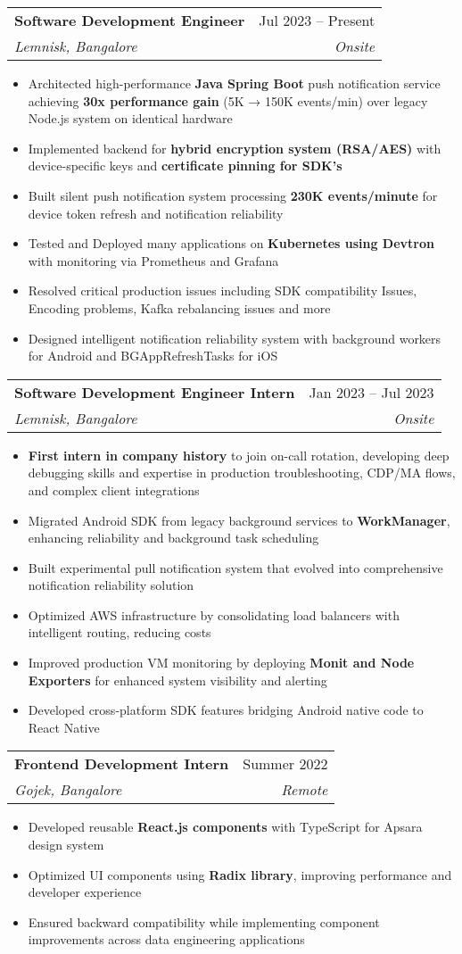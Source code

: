 \documentclass[letterpaper,10pt]{article}
\makeatletter
\newcommand{\resumeItem}[1]{
  \item\small{
    {#1 \vspace{-2pt}}
  }
}
\newcommand{\resumeSubheading}[4]{
  \vspace{-1pt}\item
    \begin{tabular*}{0.97\textwidth}[t]{l@{\extracolsep{\fill}}r}
      \textbf{#1} & #2 \\
      \textit{\small#3} & \textit{\small #4} \\
    \end{tabular*}\vspace{-5pt}
}
\newcommand{\resumeItemListStart}{\begin{itemize}[leftmargin=0.1in]}
\newcommand{\resumeItemListEnd}{\end{itemize}\vspace{-5pt}}
\makeatother
\begin{document}
    \resumeSubheading
      {Software Development Engineer}{Jul 2023 -- Present}
      {Lemnisk, Bangalore}{Onsite}
      \resumeItemListStart
        \resumeItem{Architected high-performance \textbf{Java Spring Boot} push notification service achieving \textbf{30x performance gain} (5K → 150K events/min) over legacy Node.js system on identical hardware}
        \resumeItem{Implemented backend for \textbf{hybrid encryption system (RSA/AES)} with device-specific keys and \textbf{certificate pinning for SDK's}}
        \resumeItem{Built silent push notification system processing \textbf{230K events/minute} for device token refresh and notification reliability}
        \resumeItem{Tested and Deployed many applications on \textbf{Kubernetes using Devtron} with monitoring via Prometheus and Grafana}
        \resumeItem{Resolved critical production issues including SDK compatibility Issues, Encoding problems, Kafka rebalancing issues and more}
        \resumeItem{Designed intelligent notification reliability system with background workers for Android and BGAppRefreshTasks for iOS}
      \resumeItemListEnd

    \vspace{5pt} %
    
    \resumeSubheading
      {Software Development Engineer Intern}{Jan 2023 -- Jul 2023}
      {Lemnisk, Bangalore}{Onsite}
      \resumeItemListStart
        \resumeItem{\textbf{First intern in company history} to join on-call rotation, developing deep debugging skills and expertise in production troubleshooting, CDP/MA flows, and complex client integrations}
        \resumeItem{Migrated Android SDK from legacy background services to \textbf{WorkManager}, enhancing reliability and background task scheduling}
        \resumeItem{Built experimental pull notification system that evolved into comprehensive notification reliability solution}
        \resumeItem{Optimized AWS infrastructure by consolidating load balancers with intelligent routing, reducing costs}
        \resumeItem{Improved production VM monitoring by deploying \textbf{Monit and Node Exporters} for enhanced system visibility and alerting}
        \resumeItem{Developed cross-platform SDK features bridging Android native code to React Native}
      \resumeItemListEnd

    \vspace{5pt} %
    
    \resumeSubheading
      {Frontend Development Intern}{Summer 2022}
      {Gojek, Bangalore}{Remote}
      \resumeItemListStart
        \resumeItem{Developed reusable \textbf{React.js components} with TypeScript for Apsara design system}
        \resumeItem{Optimized UI components using \textbf{Radix library}, improving performance and developer experience}
        \resumeItem{Ensured backward compatibility while implementing component improvements across data engineering applications}
      \resumeItemListEnd
\end{document}
